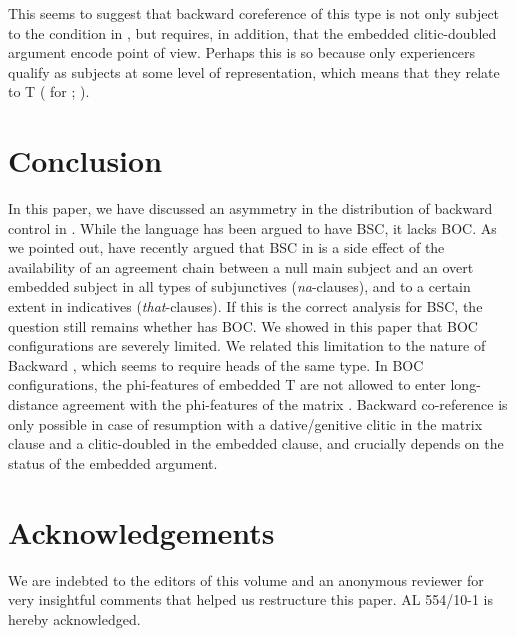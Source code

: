 \documentclass[output=paper]{langsci/langscibook}
\begin{document}
This seems to suggest that backward coreference of this type is not only subject to the condition in , but requires, in addition, that the embedded clitic-doubled argument encode point of view. Perhaps this is so because only experiencers qualify as subjects at some level of representation, which means that they relate to T (\citealt{Anagnostopoulou1999} for ; \citealt{Landau2010Locative}). 

\section{Conclusion}%

In this paper, we have discussed an asymmetry in the distribution of backward control in . While the language has been argued to have BSC, it lacks BOC. As we pointed out, \citet{Tsakali2017} have recently argued that BSC in  is a side effect of the availability of an agreement chain between a null main subject and an overt embedded subject in all types of subjunctives (\textit{na}{}-clauses), and to a certain extent in indicatives (\textit{that}{}-clauses). If this is the correct analysis for BSC, the question still remains whether  has BOC. We showed in this paper that BOC configurations are severely limited. We related this limitation to the nature of Backward , which seems to require heads of the same type. In BOC configurations, the phi-features of embedded T are not allowed to enter long-distance agreement with the phi-features of the matrix . Backward co-reference is only possible in case of resumption with a dative\slash genitive clitic in the matrix clause and a clitic-doubled  in the embedded clause, and crucially depends on the  status of the embedded argument.

\section*{Acknowledgements}

We are indebted to the editors of this volume and an anonymous reviewer for very insightful comments that helped us restructure this paper. AL 554\slash 10-1 is hereby acknowledged.
\end{document}
